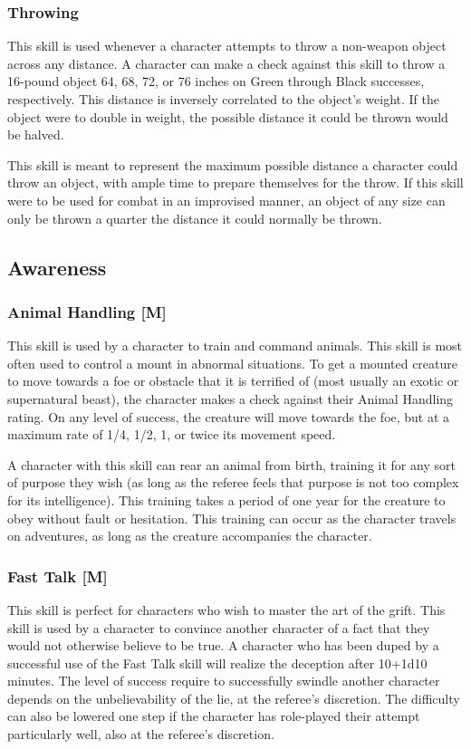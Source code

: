 \documentclass[oneside]{book}
\begin{document}
\begin{multicols}{2}
\subsubsection{Throwing}
This skill is used whenever a character attempts to throw a non-weapon object across any distance. A character can make a check against this skill to throw a 16-pound object 64, 68, 72, or 76 inches on Green through Black successes, respectively. This distance is inversely correlated to the object's weight. If the object were to double in weight, the possible distance it could be thrown would be halved. 

This skill is meant to represent the maximum possible distance a character could throw an object, with ample time to prepare themselves for the throw. If this skill were to be used for combat in an improvised manner, an object of any size can only be thrown a quarter the distance it could normally be thrown.

\subsection{Awareness}
\subsubsection{Animal Handling [M]}
This skill is used by a character to train and command animals. This skill is most often used to control a mount in abnormal situations. To get a mounted creature to move towards a foe or obstacle that it is terrified of (most usually an exotic or supernatural beast), the character makes a check against their Animal Handling rating. On any level of success, the creature will move towards the foe, but at a maximum rate of 1/4, 1/2, 1, or twice its movement speed.

A character with this skill can rear an animal from birth, training it for any sort of purpose they wish (as long as the referee feels that purpose is not too complex for its intelligence). This training takes a period of one year for the creature to obey without fault or hesitation. This training can occur as the character travels on adventures, as long as the creature accompanies the character. 

\subsubsection{Fast Talk [M]}
This skill is perfect for characters who wish to master the art of the grift. This skill is used by a character to convince another character of a fact that they would not otherwise believe to be true. A character who has been duped by a successful use of the Fast Talk skill will realize the deception after 10+1d10 minutes. The level of success require to successfully swindle another character depends on the unbelievability of the lie, at the referee's discretion. The difficulty can also be lowered one step if the character has role-played their attempt particularly well, also at the referee's discretion. 


\end{multicols}
\end{document}
